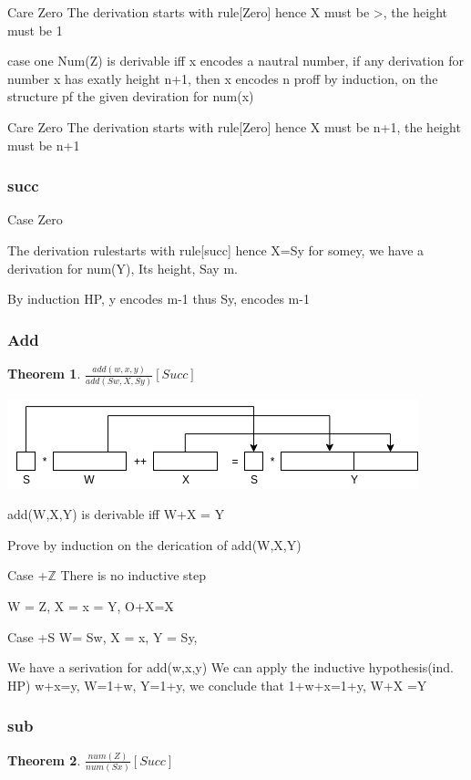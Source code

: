 \documentclass[a4paper,10pt,titlepage]{report}
\newtheorem{theorem}{Theorem}
\newcommand{\Z}{\mathbb{Z}}
\begin{document}
Care Zero
The derivation starts with rule[Zero] hence X must be >, the height must be 1

case one
Num(Z) is derivable iff x encodes a nautral number, if any derivation for number x has exatly height n+1, then x encodes n
proff by induction, on the structure pf the given deviration for num(x)

Care Zero
The derivation starts with rule[Zero] hence X must be n+1, the height must be n+1

\subsubsection{succ}
Case Zero

The derivation rulestarts with rule[succ] hence X=Sy for somey, we have a derivation for num(Y), Its height, Say m.

By induction HP, y encodes m-1 thus Sy, encodes m-1


\subsubsection{Add}
\begin{theorem}

$\frac{add(w,x,y)}{add(Sw, X, Sy)}[Succ]$

\end{theorem}

\includegraphics[scale=0.4]{draw.io/fig1.png}

add(W,X,Y) is derivable iff W+X = Y

Prove by induction on the derication of add(W,X,Y)

Case +$\Z$
There is no inductive step

W = Z, X = x = Y, O+X=X$ \check{}$

Case +S W= Sw, X = x, Y = Sy,

We have a serivation for add(w,x,y)
We can apply the inductive hypothesis(ind. HP)
w+x=y, W=1+w, Y=1+y, we conclude that 1+w+x=1+y, W+X =Y


\subsubsection{sub}
\begin{theorem}

$\frac{num(Z)}{num(Sx)}[Succ]$

\end{theorem}
\end{document}
